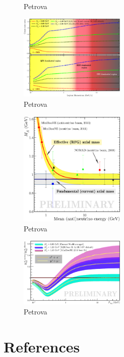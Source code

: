 \documentclass[review]{elsarticle}
\begin{document}
\begin{figure}[h!]
\begin{center}
\caption{Petrova}
\label{MiniBooNE}
\end{center}
\end{figure}

\begin{figure}[h!]
\begin{center}
\includegraphics[width=0.45\textwidth]{./SK/Count_rate_ratio.eps}
\caption{Petrova}
\label{CountRate}
\end{center}
\end{figure}

\begin{figure}[h!]
\begin{center}
\includegraphics[width=0.45\textwidth]{./QES/MA_QES_Effective-2.eps}
\caption{Petrova}
\label{MA_QES_Effective}
\end{center}
\end{figure}

\begin{figure}[h!]
\begin{center}
\includegraphics[width=0.45\textwidth]{./SK/cvsv2lmn_all2.eps}
\caption{Petrova}
\label{EventRates}
\end{center}
\end{figure}

\section*{References}

\end{document}

